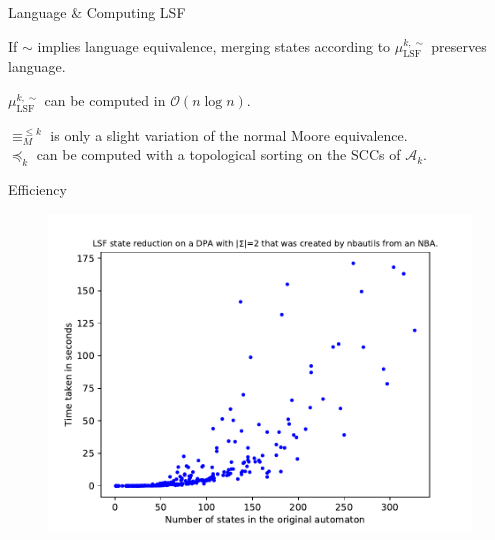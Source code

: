 \begin{frame}{Language \& Computing LSF}
\begin{theorem}
	If $\sim$ implies language equivalence, merging states according to $\mu_\text{LSF}^{k,\sim}$ preserves language.
\end{theorem}

\pause
\vspace{1cm}

	\begin{theorem}
		$\mu_\text{LSF}^{k,\sim}$ can be computed in $\mathcal{O}(n \log n)$.
	\end{theorem}
	
$\equiv_M^{\leq k}$ is only a slight variation of the normal Moore equivalence. \\
$\preceq_k$ can be computed with a topological sorting on the SCCs of $\mathcal{A}_k$.
\end{frame}



\begin{frame}{Efficiency}
\begin{figure}
	\centering
	\includegraphics[page=6,height=.8\textheight]{../data/analysis/lsf/detnbaut_ap1.pdf} 
\end{figure}
\end{frame}




